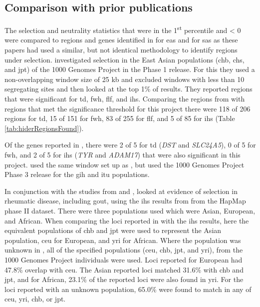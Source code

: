 \documentclass[]{report}
\begin{document}
\subsection{Comparison with prior publications}\label{priorPubs}

The selection and neutrality statistics that were in the
1\textsuperscript{st} percentile and \textless{} 0 were compared to
regions and genes identified in \citet{Hider2013} for \gls{eas} and
\citet{Jonnalagadda2017} for \gls{sas} as these papers had used a
similar, but not identical methodology to identify regions under
selection. \citet{Hider2013} investigated selection in the East Asian
populations (\gls{chb}, \gls{chs}, and \gls{jpt}) of the 1000 Genomes
Project in the Phase 1 release. For this they used a non-overlapping
window size of 25 kb and excluded windows with less than 10 segregating
sites and then looked at the top 1\% of results. They reported regions
that were significant for \gls{td}, \gls{fwh}, \gls{flf}, and \gls{ihs}.
Comparing the regions from \citet{Hider2013} with regions that met the
significance threshold for this project there were 118 of 206 regions
for \gls{td}, 15 of 151 for \gls{fwh}, 83 of 255 for \gls{flf}, and 5 of
85 for \gls{ihs} (Table \ref{tab:hiderRegionsFound}).

Of the genes reported in \citet{Jonnalagadda2017}, there were 2 of 5 for
\gls{td} (\emph{DST} and \emph{SLC24A5}), 0 of 5 for \gls{fwh}, and 2 of
5 for \gls{ihs} (\emph{TYR} and \emph{ADAM17}) that were also
significant in this project. \citet{Jonnalagadda2017} used the same
window set up as \citet{Hider2013}, but used the 1000 Genomes Project
Phase 3 release for the \gls{gih} and \gls{itu} populations.

In conjunction with the studies from \citet{Hider2013} and
\citet{Jonnalagadda2017}, \citet{Ramos2017} looked at evidence of
selection in rheumatic disease, including gout, using the \gls{ihs}
results from \citet{voight2006map} from the HapMap phase II dataset.
There were three populations used which were Asian, European, and
African. When comparing the loci reported in \citet{Ramos2017} with the
\gls{ihs} results, here the equivalent populations of \gls{chb} and
\gls{jpt} were used to represent the Asian population, \gls{ceu} for
European, and \gls{yri} for African. Where the population was unknown in
\citet{Ramos2017}, all of the specified populations (\gls{ceu},
\gls{chb}, \gls{jpt}, and \gls{yri}), from the 1000 Genomes Project
individuals were used. Loci reported for European had 47.8\% overlap
with \gls{ceu}. The Asian reported loci matched 31.6\% with \gls{chb}
and \gls{jpt}, and for African, 23.1\% of the reported loci were also
found in \gls{yri}. For the loci reported with an unknown population,
65.0\% were found to match in any of \gls{ceu}, \gls{yri}, \gls{chb}, or
\gls{jpt}.
\end{document}
